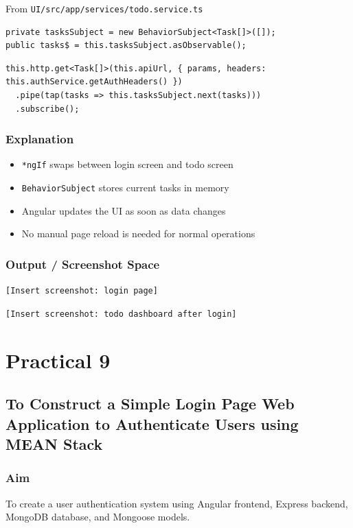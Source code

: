 \documentclass[12pt,a4paper]{article}
\begin{document}
From \texttt{UI/src/app/services/todo.service.ts}
\begin{lstlisting}[style=projectcode]
private tasksSubject = new BehaviorSubject<Task[]>([]);
public tasks$ = this.tasksSubject.asObservable();
\end{lstlisting}

\begin{lstlisting}[style=projectcode]
this.http.get<Task[]>(this.apiUrl, { params, headers: this.authService.getAuthHeaders() })
  .pipe(tap(tasks => this.tasksSubject.next(tasks)))
  .subscribe();
\end{lstlisting}

\subsubsection*{Explanation}
\begin{itemize}
  \item \texttt{*ngIf} swaps between login screen and todo screen
  \item \texttt{BehaviorSubject} stores current tasks in memory
  \item Angular updates the UI as soon as data changes
  \item No manual page reload is needed for normal operations
\end{itemize}

\subsubsection*{Output / Screenshot Space}
\texttt{[Insert screenshot: login page]}

\texttt{[Insert screenshot: todo dashboard after login]}

\section*{Practical 9}
\subsection*{To Construct a Simple Login Page Web Application to Authenticate Users using MEAN Stack}

\subsubsection*{Aim}
To create a user authentication system using Angular frontend, Express backend, MongoDB database, and Mongoose models.
\end{document}
